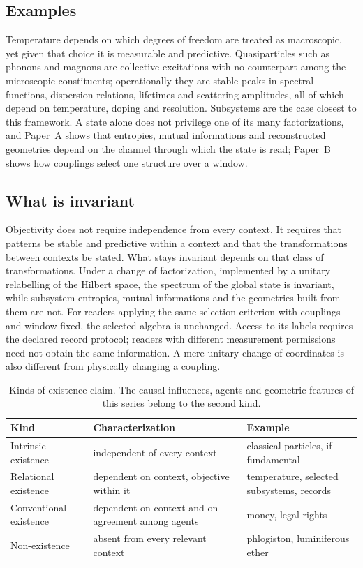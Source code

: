 \documentclass[11pt,a4paper]{article}
\begin{document}
\subsection{Examples}

Temperature depends on which degrees of freedom are treated as macroscopic, yet given that choice it is measurable and predictive. Quasiparticles such as phonons and magnons are collective excitations with no counterpart among the microscopic constituents; operationally they are stable peaks in spectral functions, dispersion relations, lifetimes and scattering amplitudes, all of which depend on temperature, doping and resolution. Subsystems are the case closest to this framework. A state alone does not privilege one of its many factorizations, and Paper~A shows that entropies, mutual informations and reconstructed geometries depend on the channel through which the state is read; Paper~B shows how couplings select one structure over a window.

\subsection{What is invariant}

Objectivity does not require independence from every context. It requires that patterns be stable and predictive within a context and that the transformations between contexts be stated. What stays invariant depends on that class of transformations. Under a change of factorization, implemented by a unitary relabelling of the Hilbert space, the spectrum of the global state is invariant, while subsystem entropies, mutual informations and the geometries built from them are not. For readers applying the same selection criterion with couplings and
window fixed, the selected algebra is unchanged. Access to its labels
requires the declared record protocol; readers with different measurement
permissions need not obtain the same information. A mere unitary change
of coordinates is also different from physically changing a coupling.

\begin{table}[ht]
\centering
\small
\begin{tabular}{P{3.3cm}P{5.2cm}P{4.8cm}}
\toprule
Kind & Characterization & Example\\
\midrule
Intrinsic existence & independent of every context & classical particles, if fundamental\\
Relational existence & dependent on context, objective within it & temperature, selected subsystems, records\\
Conventional existence & dependent on context and on agreement among agents & money, legal rights\\
Non-existence & absent from every relevant context & phlogiston, luminiferous ether\\
\bottomrule
\end{tabular}
\caption{Kinds of existence claim. The causal influences, agents and geometric features of this series belong to the second kind.}
\label{tab:existence}
\end{table}
\end{document}
